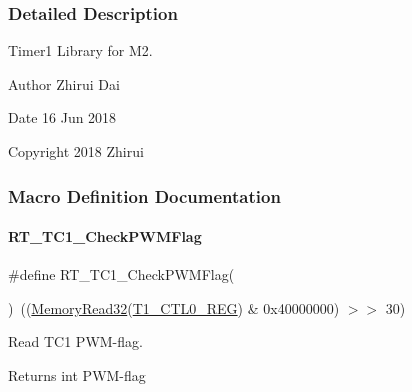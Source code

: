 \subsubsection{Detailed Description}
Timer1 Library for M2. 

\begin{DoxyAuthor}{Author}
Zhirui Dai 
\end{DoxyAuthor}
\begin{DoxyDate}{Date}
16 Jun 2018 
\end{DoxyDate}
\begin{DoxyCopyright}{Copyright}
2018 Zhirui 
\end{DoxyCopyright}


\subsubsection{Macro Definition Documentation}
\mbox{\label{a00044_acf0b6d73b626b9f56f9f6fda79d0860c}} 
\paragraph{\texorpdfstring{R\+T\+\_\+\+T\+C1\+\_\+\+Check\+P\+W\+M\+Flag}{RT\_TC1\_CheckPWMFlag}}
{\footnotesize\ttfamily \#define R\+T\+\_\+\+T\+C1\+\_\+\+Check\+P\+W\+M\+Flag(\begin{DoxyParamCaption}{ }\end{DoxyParamCaption})~((\mbox{\hyperlink{a00020_a2d484dc15bdf30ee11ab3b05f31f0e16}{Memory\+Read32}}(\mbox{\hyperlink{a00020_adadaa0ab1ebbd7ba9b70dfd24c3ed44da38632250c2e72df96fcaa3f8bd8ecc5e}{T1\+\_\+\+C\+T\+L0\+\_\+\+R\+EG}}) \& 0x40000000) $>$$>$ 30)}



Read T\+C1 P\+W\+M-\/flag. 

\begin{DoxyReturn}{Returns}
int P\+W\+M-\/flag 
\end{DoxyReturn}
\mbox{\label{a00044_a3395d62010d1ca815676f3086f0dfb4a}} 
